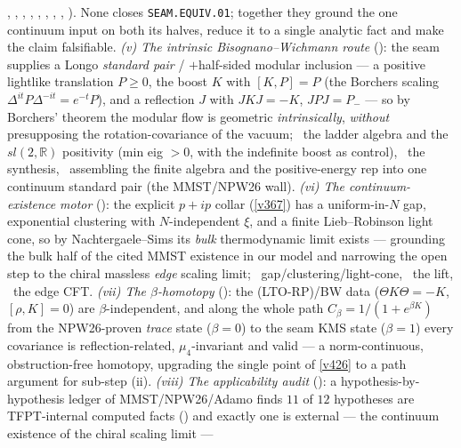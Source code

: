 \documentclass[11pt,a4paper]{article}
\begin{document}
\begin{keybox}
{, ,
, ,
, ,
, ,
).} None closes
\texttt{SEAM.EQUIV.01}; together they ground the one continuum input on both its halves, reduce it to a single
analytic fact and make the claim falsifiable.
\emph{(v) The intrinsic Bisognano--Wichmann route} (): the seam supplies a
Longo \emph{standard pair} / $+$half-sided modular inclusion --- a positive lightlike translation $P\ge0$, the
boost $K$ with $[K,P]{=}P$ (the Borchers scaling $\Delta^{it}P\Delta^{-it}{=}e^{-t}P$), and a reflection
$J$ with $JKJ{=}{-}K$, $JPJ{=}P_-$ --- so by Borchers' theorem the modular flow is geometric \emph{intrinsically},
\emph{without} presupposing the rotation-covariance of the vacuum; \mE\ the ladder algebra and the $sl(2,\mathbb{R})$
positivity (min eig $>0$, with the indefinite boost as control), \mC\ the synthesis, \mO\ assembling the finite
algebra and the positive-energy rep into one continuum standard pair (the MMST/NPW26 wall). \emph{(vi) The
continuum-existence motor} (): the explicit $p{+}ip$ collar (\vref{v367}) has
a uniform-in-$N$ gap, exponential clustering with $N$-independent $\xi$, and a finite Lieb--Robinson light cone, so
by Nachtergaele--Sims its \emph{bulk} thermodynamic limit exists --- grounding the bulk half of the cited MMST
existence in our model and narrowing the open step to the chiral massless \emph{edge} scaling limit;
\mE\ gap/clustering/light-cone, \mC\ the lift, \mO\ the edge CFT. \emph{(vii) The $\beta$-homotopy}
(): the (LTO-RP)/BW data ($\Theta K\Theta{=}{-}K$, $[\rho,K]{=}0$) are
$\beta$-independent, and along the whole path $C_\beta{=}1/(1{+}e^{\beta K})$ from the NPW26-proven \emph{trace}
state ($\beta{=}0$) to the seam KMS state ($\beta{=}1$) every covariance is reflection-related, $\mu_4$-invariant
and valid --- a norm-continuous, obstruction-free homotopy, upgrading the single point of \vref{v426} to a path
argument for sub-step (ii). \emph{(viii) The applicability audit} ():
a hypothesis-by-hypothesis ledger of MMST/NPW26/Adamo finds $11$ of $12$ hypotheses are TFPT-internal computed
facts (\mE) and exactly one is external --- the continuum existence of the chiral scaling limit ---

\end{keybox}
\end{document}
